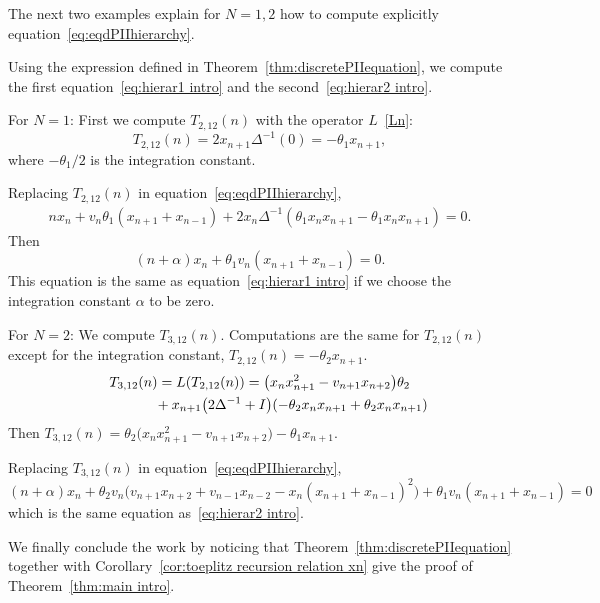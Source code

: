 \documentclass[pdftex]{sigma}%
\numberwithin{equation}{section}
\begin{document}
The next two examples explain for $N=1,2$ how to compute explicitly equation~\eqref{eq:eqdPIIhierarchy}.

	\begin{Example}\label{ex:computationsDiscetePIIN=12}
		Using the expression defined in Theorem~\ref{thm:discretePIIequation}, we compute the first equation~\eqref{eq:hierar1 intro} and the second~\eqref{eq:hierar2 intro}.

		For $N=1$: First we compute $T_{2,12}(n)$ with the operator $L$~\eqref{Ln}:
\begin{equation*}
T_{2,12}(n)=2x_{n+1}\Delta^{-1}(0)=-\theta_1x_{n+1},
\end{equation*}
		where $-\theta_1/2$ is the integration constant.

		Replacing $T_{2,12}(n)$ in equation~\eqref{eq:eqdPIIhierarchy},
\begin{gather*}
nx_n+v_n\theta_1(x_{n+1}+x_{n-1})+2x_n\Delta^{-1}(\theta_1x_nx_{n+1}-\theta_1x_nx_{n+1})=0.
\end{gather*}
		Then
\begin{equation*}
(n+\alpha)x_n+\theta_1v_n(x_{n+1}+x_{n-1})=0.
\end{equation*}
This equation is the same as equation~\eqref{eq:hierar1 intro} if we choose the integration constant $\alpha$ to be zero.

		For $N=2$: We compute $T_{3,12}(n)$. Computations are the same for $T_{2,12}(n)$ except for the integration constant, $T_{2,12}(n)=-\theta_2x_{n+1}$.
\begin{gather*}
T_{3,12}(n)=L(T_{2,12}(n))=\big(x_nx_{n+1}^2-v_{n+1}x_{n+2}\big)\theta_2
\\ \hphantom{T_{3,12}(n)=}
{}+x_{n+1}\big(2\Delta^{-1}+I\big)(-\theta_2x_nx_{n+1}+\theta_2x_nx_{n+1})
\end{gather*}
Then $T_{3,12}(n)=\theta_2\big(x_nx_{n+1}^2-v_{n+1}x_{n+2}\big)-\theta_1x_{n+1}$.

Replacing $T_{3,12}(n)$ in equation~\eqref{eq:eqdPIIhierarchy},
\begin{equation*}
(n+\alpha)x_n+\theta_2v_n\big(v_{n+1}x_{n+2}+v_{n-1}x_{n-2}-x_n(x_{n+1}+x_{n-1})^2\big)
+\theta_1v_n(x_{n+1}+x_{n-1})=0
\end{equation*}
		which is the same equation as~\eqref{eq:hierar2 intro}.
	\end{Example}
We finally conclude the work by noticing that Theorem~\ref{thm:discretePIIequation} together with Corollary~\ref{cor:toeplitz recursion relation xn} give the proof of Theorem~\ref{thm:main intro}.
\end{document}
